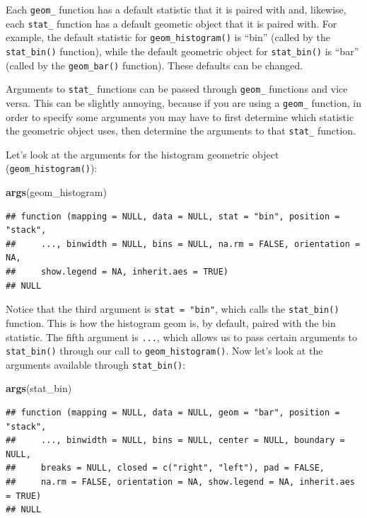 \documentclass[
]{book}
\newenvironment{Shaded}{\begin{snugshade}}{\end{snugshade}}
\newcommand{\KeywordTok}[1]{\textcolor[rgb]{0.13,0.29,0.53}{\textbf{#1}}}
\newcommand{\NormalTok}[1]{#1}
\begin{document}
Each \texttt{geom\_} function has a default statistic that it is paired with and, likewise, each \texttt{stat\_} function has a default geometic object that it is paired with. For example, the default statistic for \texttt{geom\_histogram()} is ``bin'' (called by the \texttt{stat\_bin()} function), while the default geometric object for \texttt{stat\_bin()} is ``bar'' (called by the \texttt{geom\_bar()} function). These defaults can be changed.

Arguments to \texttt{stat\_} functions can be passed through \texttt{geom\_} functions and vice versa. This can be slightly annoying, because if you are using a \texttt{geom\_} function, in order to specify some arguments you may have to first determine which statistic the geometric object uses, then determine the arguments to that \texttt{stat\_} function.

Let's look at the arguments for the histogram geometric object (\texttt{geom\_histogram()}):

\begin{Shaded}
\begin{Highlighting}[]
\KeywordTok{args}\NormalTok{(geom\_histogram)}
\end{Highlighting}
\end{Shaded}

\begin{verbatim}
## function (mapping = NULL, data = NULL, stat = "bin", position = "stack", 
##     ..., binwidth = NULL, bins = NULL, na.rm = FALSE, orientation = NA, 
##     show.legend = NA, inherit.aes = TRUE) 
## NULL
\end{verbatim}

Notice that the third argument is \texttt{stat\ =\ "bin"}, which calls the \texttt{stat\_bin()} function. This is how the histogram geom is, by default, paired with the bin statistic. The fifth argument is \texttt{...}, which allows us to pass certain arguments to \texttt{stat\_bin()} through our call to \texttt{geom\_histogram()}. Now let's look at the arguments available through \texttt{stat\_bin()}:

\begin{Shaded}
\begin{Highlighting}[]
\KeywordTok{args}\NormalTok{(stat\_bin)}
\end{Highlighting}
\end{Shaded}

\begin{verbatim}
## function (mapping = NULL, data = NULL, geom = "bar", position = "stack", 
##     ..., binwidth = NULL, bins = NULL, center = NULL, boundary = NULL, 
##     breaks = NULL, closed = c("right", "left"), pad = FALSE, 
##     na.rm = FALSE, orientation = NA, show.legend = NA, inherit.aes = TRUE) 
## NULL
\end{verbatim}
\end{document}
